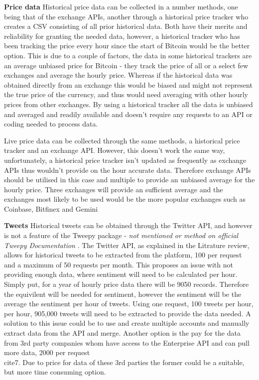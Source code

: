 \documentclass[oneside, 10pt]{article}
\begin{document}
		\textbf{Price data}
		\newline
		\newline
		Historical price data can be collected in a number methods, one being that of the exchange APIs, another through a historical price tracker who creates a CSV consisting of all prior historical data. Both have their merits and reliability for granting the needed data, however, a historical tracker who has been tracking the price every hour since the start of Bitcoin would be the better option. This is due to a couple of factors, the data in some historical trackers are an average unbiased price for Bitcoin - they track the price of all or a select few exchanges and average the hourly price. Whereas if the historical data was obtained directly from an exchange this would be biased and might not represent the true price of the currency, and thus would need averaging with other hourly prices from other exchanges. By using a historical tracker all the data is unbiased and averaged and readily available and doesn't require any requests to an API or coding needed to process data.
		
		Live price data can be collected through the same methods, a historical price tracker and an exchange API. However, this doesn't work the same way, unfortunately, a historical price tracker isn't updated as frequently as exchange APIs thus wouldn't provide on the hour accurate data. Therefore exchange APIs should be utilised in this case and multiple to provide an unbiased average for the hourly price. Three exchanges will provide an sufficient average and the exchanges most likely to be used would be the more popular exchanges such as Coinbase, Bitfinex and Gemini
		\newline
		
		\textbf{Tweets}
		\newline
		\newline
		Historical tweets can be obtained through the Twitter API, and however is not a feature of the Tweepy package - \textit{not mentioned or method on official Tweepy Documentation} \cite{33}. The Twitter API, as explained in the Litrature review, allows for historical tweets to be extracted from the platform, 100 per request and a maximum of 50 requests per month. This proposes an issue with not providing enough data, where sentiment will need to be calculated per hour. Simply put, for a year of hourly price data there will be 9050 records. Therefore the equivilent will be needed for sentiment, however the sentiment will be the average the sentiment per hour of tweets. Using one request, 100 tweets per hour, per hour, 905,000 tweets will need to be extracted to provide the data needed. A solution to this issue could be to use and create multiple accounts and manually extract data from the API and merge. Another option is the pay for the data from 3rd party companies whom have access to the Enterprise API and can pull more data, 2000 per request \\cite{7}\cite{8}. Due to price for data of these 3rd parties the former could be a suitable, but more time consuming option.
		
\end{document}

